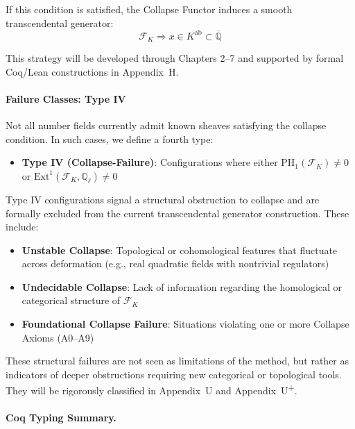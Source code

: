 \documentclass[11pt]{article}
\begin{document}
If this condition is satisfied, the Collapse Functor induces a smooth transcendental generator:
\[
\mathcal{F}_K \Rightarrow x \in K^{\mathrm{ab}} \subset \overline{\mathbb{Q}}
\]

This strategy will be developed through Chapters 2–7 and supported by formal Coq/Lean constructions in Appendix~H.

\vspace{1em}
\paragraph{Failure Classes: Type IV}

Not all number fields currently admit known sheaves satisfying the collapse condition. In such cases, we define a fourth type:

\begin{itemize}
    \item \textbf{Type IV (Collapse-Failure)}: Configurations where either \( \mathrm{PH}_1(\mathcal{F}_K) \neq 0 \) or \( \mathrm{Ext}^1(\mathcal{F}_K, \mathbb{Q}_\ell) \neq 0 \)
\end{itemize}

Type IV configurations signal a structural obstruction to collapse and are formally excluded from the current transcendental generator construction. These include:

\begin{itemize}
    \item \textbf{Unstable Collapse}: Topological or cohomological features that fluctuate across deformation (e.g., real quadratic fields with nontrivial regulators)
    \item \textbf{Undecidable Collapse}: Lack of information regarding the homological or categorical structure of \( \mathcal{F}_K \)
    \item \textbf{Foundational Collapse Failure}: Situations violating one or more Collapse Axioms (A0–A9)
\end{itemize}

These structural failures are not seen as limitations of the method, but rather as indicators of deeper obstructions requiring new categorical or topological tools. They will be rigorously classified in Appendix~U and Appendix~U\textsuperscript{+}.

\vspace{1em}
\paragraph{Coq Typing Summary.}
\end{document}
